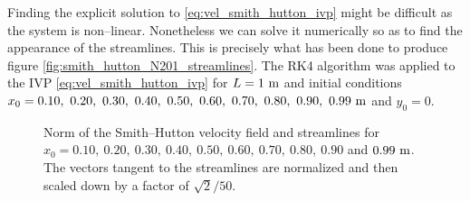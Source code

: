 Finding the explicit solution to \eqref{eq:vel_smith_hutton_ivp} might be
difficult as the system is non--linear. Nonetheless we can solve it numerically
so as to find the appearance of the streamlines. This is precisely what has been
done to produce figure \eqref{fig:smith_hutton_N201_streamlines}. The RK4
algorithm was applied to the IVP \eqref{eq:vel_smith_hutton_ivp} for $L = 1 \
\meter$ and initial conditions $x_0 = 0.10, \ 0.20, \ 0.30, \ 0.40, \ 0.50, \
0.60, \ 0.70, \ 0.80, \ 0.90, \ 0.99 \ \meter$ and $y_0 = 0$.

\begin{figure}[ht]
	\centering
	
	\captionsetup{width=0.75\textwidth}
	\caption{Norm of the Smith--Hutton velocity field and streamlines for $x_0 =
	0.10, \ 0.20, \ 0.30, \ 0.40, \ 0.50, \ 0.60, \ 0.70, \ 0.80, \ 0.90$ and
	$0.99 \ \meter$. The vectors tangent to the streamlines are normalized and
	then scaled down by a factor of $\sqrt{2}/50$.}
	\label{fig:smith_hutton_N201_streamlines}
\end{figure}